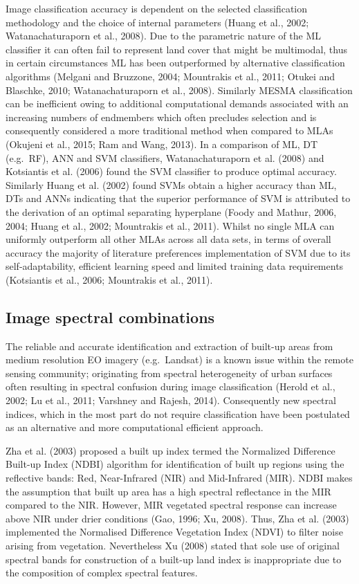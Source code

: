 \documentclass[]{book}
\begin{document}
Image classification accuracy is dependent on the selected
classification methodology and the choice of internal parameters (Huang
et al., 2002; Watanachaturaporn et al., 2008). Due to the parametric
nature of the ML classifier it can often fail to represent land cover
that might be multimodal, thus in certain circumstances ML has been
outperformed by alternative classification algorithms (Melgani and
Bruzzone, 2004; Mountrakis et al., 2011; Otukei and Blaschke, 2010;
Watanachaturaporn et al., 2008). Similarly MESMA classification can be
inefficient owing to additional computational demands associated with an
increasing numbers of endmembers which often precludes selection and is
consequently considered a more traditional method when compared to MLAs
(Okujeni et al., 2015; Ram and Wang, 2013). In a comparison of ML, DT
(e.g.~RF), ANN and SVM classifiers, Watanachaturaporn et al. (2008) and
Kotsiantis et al. (2006) found the SVM classifier to produce optimal
accuracy. Similarly Huang et al. (2002) found SVMs obtain a higher
accuracy than ML, DTs and ANNs indicating that the superior performance
of SVM is attributed to the derivation of an optimal separating
hyperplane (Foody and Mathur, 2006, 2004; Huang et al., 2002; Mountrakis
et al., 2011). Whilst no single MLA can uniformly outperform all other
MLAs across all data sets, in terms of overall accuracy the majority of
literature preferences implementation of SVM due to its
self-adaptability, efficient learning speed and limited training data
requirements (Kotsiantis et al., 2006; Mountrakis et al., 2011).

\subsection{Image spectral
combinations}\label{image-spectral-combinations}

The reliable and accurate identification and extraction of built-up
areas from medium resolution EO imagery (e.g.~Landsat) is a known issue
within the remote sensing community; originating from spectral
heterogeneity of urban surfaces often resulting in spectral confusion
during image classification (Herold et al., 2002; Lu et al., 2011;
Varshney and Rajesh, 2014). Consequently new spectral indices, which in
the most part do not require classification have been postulated as an
alternative and more computational efficient approach.

Zha et al. (2003) proposed a built up index termed the Normalized
Difference Built-up Index (NDBI) algorithm for identification of built
up regions using the reflective bands: Red, Near-Infrared (NIR) and
Mid-Infrared (MIR). NDBI makes the assumption that built up area has a
high spectral reflectance in the MIR compared to the NIR. However, MIR
vegetated spectral response can increase above NIR under drier
conditions (Gao, 1996; Xu, 2008). Thus, Zha et al. (2003) implemented
the Normalised Difference Vegetation Index (NDVI) to filter noise
arising from vegetation. Nevertheless Xu (2008) stated that sole use of
original spectral bands for construction of a built-up land index is
inappropriate due to the composition of complex spectral features.
\end{document}
